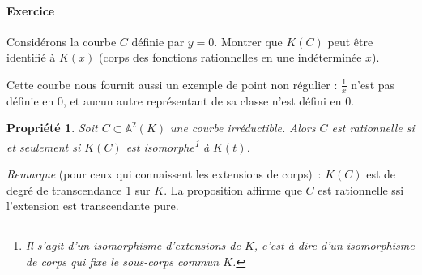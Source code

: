 \documentclass[a4paper, 11pt]{article}
\newtheorem{propriété}[théorème]{Propriété}
\theoremstyle{definition}
\newcommand{\aff}{\mathbb{A}}
\begin{document}
\paragraph{Exercice}
Considérons la courbe $C$ définie par $y = 0$.
Montrer que $K(C)$ peut être identifié à $K(x)$ (corps des fonctions
rationnelles en une indéterminée $x$).

Cette courbe nous fournit aussi un exemple de point non régulier :
$\frac{1}{x}$ n'est pas définie en $0$, et aucun autre représentant de
sa classe n'est défini en $0$.

\begin{propriété}
  Soit $C \subset \aff^2(K)$ une courbe irréductible. Alors $C$ est
  rationnelle si et seulement si $K(C)$ est isomorphe\footnote{Il
    s'agit d'un isomorphisme d'extensions de $K$, c'est-à-dire d'un
    isomorphisme de corps qui fixe le sous-corps commun $K$.} à
  $K(t)$.
\end{propriété}
\textit{Remarque} (pour ceux qui connaissent les extensions de
corps)~: $K(C)$ est de degré de transcendance 1 sur $K$. La
proposition affirme que $C$ est rationnelle ssi l'extension est
transcendante pure.
\end{document}
